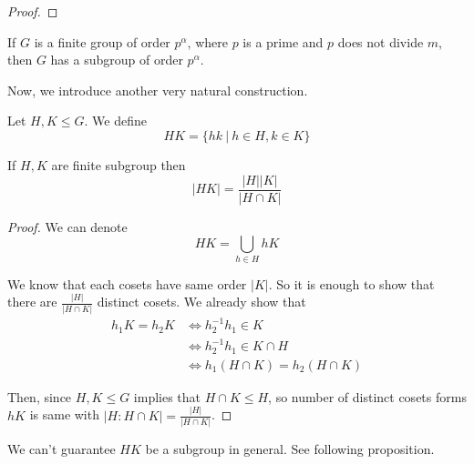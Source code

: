 \documentclass[12pt, a4paper, openany, twoside]{book}
\theoremstyle{definition}
\theoremstyle{remark}
\theoremstyle{plain}
\numberwithin{equation}{section}
\begin{document}
\begin{proof}
    


\end{proof}

\begin{tcolorbox}[colback=yellow!10!white,colframe=blue!75!black,title=Sylow's Theorem]

    If $G$ is a finite group of order $p^\alpha$, where $p$ is a prime and $p$ does not divide $m$, then $G$ has a subgroup of order $p^\alpha$.
    
\end{tcolorbox}

Now, we introduce another very natural construction. 

\begin{tcolorbox}[colback=yellow!10!white,colframe=brown!75!black,title=Subgroup Multiplication]

Let $H, K \leq G$. We define 
\[HK = \{hk ~|~ h \in H, k \in K\}\]

\end{tcolorbox}

\begin{tcolorbox}[colback=yellow!10!white,colframe=green!75!black,title=Proposition 13]

If $H, K$ are finite subgroup then 
\[|HK| = \frac{|H||K|}{|H \cap K|}\]

\end{tcolorbox}

\begin{proof}
    
We can denote 
\[HK = \bigcup_{h \in H} hK\]

We know that each cosets have same order $|K|$. So it is enough to show that there are 
$\frac{|H|}{|H\cap K|}$ distinct cosets. We already show that 
\begin{align*}
    h_1K = h_2K &\iff h_2^{-1}h_1 \in K \\
    & \iff h_2^{-1}h_1 \in K \cap H \\
    & \iff h_1(H \cap K) = h_2(H \cap K)
\end{align*}

Then, since $H, K \leq G$ implies that $H \cap K \leq H$, so number of distinct cosets forms $hK$ is 
same with $|H:H\cap K| = \frac{|H|}{|H\cap K|}$. 

\end{proof}

\begin{tcolorbox}[colback=yellow!10!white,colframe=red!75!black,title=!Caution!]

We can't guarantee $HK$ be a subgroup in general. See following proposition.

\end{tcolorbox}
\end{document}
